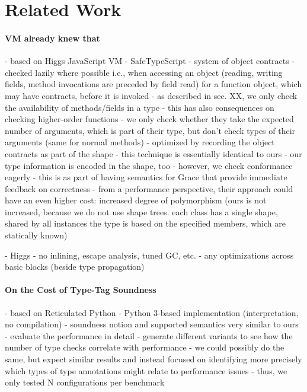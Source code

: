 
\section{Related Work}

\paragraph{VM already knew that}

\begin{cnote}
- based on Higgs JavaScript VM
- SafeTypeScript
  - system of object contracts
  - checked lazily where possible
    i.e., when accessing an object (reading, writing fields, method invocations are preceded by field read)
    for a function object, which may have contracts, before it is invoked
  - as described in sec. XX, we only check the availability of methods/fields
    in a type
    - this has also consequences on checking higher-order functions
      - we only check whether they take the expected number of arguments,
        which is part of their type, but don't check types of their arguments
        (same for normal methods)
  - optimized by recording the object contracts as part of the shape
  - this technique is essentially identical to ours
    - our type information is encoded in the shape, too
    - however, we check conformance eagerly
      - this is as part of having semantics for Grace that provide immediate
        feedback on correctness
    - from a performance perspective, their approach could have an even higher
      cost: increased degree of polymorphism (ours is not increased,
      because we do not use shape trees.
      each class has a single shape, shared by all instances
      the type is based on the specified members, which are statically known)

- Higgs
  - no inlining, escape analysis, tuned GC, etc.
  - any optimizations across basic blocks (beside type propagation)

\end{cnote}


\paragraph{On the Cost of Type-Tag Soundness}
\begin{cnote}
- based on Reticulated Python
  - Python 3-based implementation (interpretation, no compilation)
- soundness notion and supported semantics very similar to ours
- evaluate the performance in detail
 - generate different variants to see how the number of type checks correlate
   with performance
 - we could possibly do the same, but expect similar results and instead
   focused on identifying more precisely which types of type annotations
   might relate to performance issues
   - thus, we only tested N configurations per benchmark
\end{cnote}

